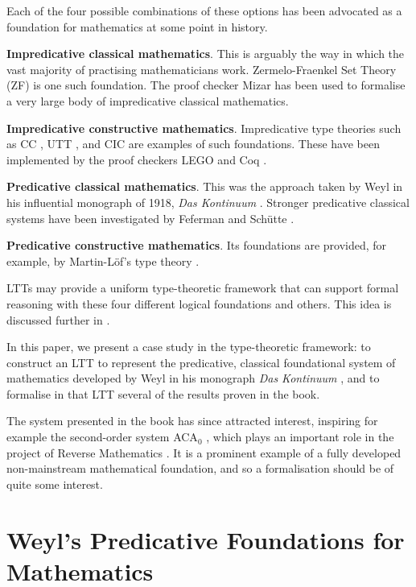 \documentclass[acmtocl]{acmtrans2m}
\begin{document}
Each of the four possible combinations of these
options has been advocated as a foundation for mathematics at
some point in history.
\begin{longitem}
\item
\textbf{Impredicative classical mathematics}. This is arguably the way in
which the vast majority of practising mathematicians work.
Zermelo-Fraenkel Set Theory (ZF) is one such foundation.  The proof checker Mizar \cite{muzalewski:mizar} has been used to formalise a very large body of impredicative classical mathematics.
\item
\textbf{Impredicative constructive mathematics}.  Impredicative
type theories such as CC \cite{ch:coc}, UTT \cite{luo:car}, and CIC \cite{coq'art}
are examples of such foundations.  These have been implemented by the proof checkers LEGO \cite{legoWWW} and Coq \cite{Coq:manual}.
\item
\textbf{Predicative classical mathematics}.  This was the approach
taken by Weyl in his influential monograph of 1918, \emph{Das
Kontinuum} \cite{weyl:kontinuum}.  Stronger predicative classical systems have been investigated by Feferman \cite{feferman:spa} and Sch\"utte \cite{schutte:pwo}.
\item
\textbf{Predicative constructive mathematics}.  Its foundations are
provided, for example, by Martin-L\"{o}f's type theory
\cite{pmltt,ml:itt}.
\end{longitem}

LTTs may provide a uniform type-theoretic framework that can
support formal reasoning with these four different logical foundations and others.  This idea is discussed further in
\cite{luo:LTT06}.

In this paper, we present a case study in the type-theoretic
framework: to construct an LTT to represent the predicative, classical foundational system of mathematics
developed by Weyl in his monograph \textit{Das Kontinuum}
\cite{weyl:kontinuum}, and to formalise in that LTT several of
the results proven in the book.

The system presented in the
book has since attracted interest, inspiring for example the
second-order system ACA$_0$ \cite{feferman:kontinuum}, which plays
an important role in the project of Reverse Mathematics
\cite{simpson:sosoa}.  It is a prominent example of a fully
developed non-mainstream mathematical foundation, and so a
formalisation should be of quite some interest.

\section{Weyl's Predicative Foundations for Mathematics}
\label{section:weyl}
\end{document}
